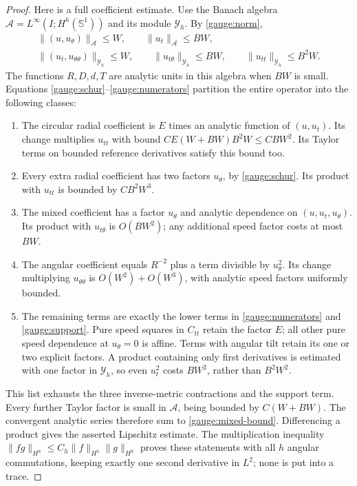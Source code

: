 \begin{proof}
Here is a full coefficient estimate.  Use the Banach algebra
$\mathcal A=L^\infty(I;H^h(\mathbb S^1))$ and its module
$\mathcal Y_h$.  By \eqref{gauge:norm},
\begin{equation}
 \begin{gathered}
 \|(u,u_\theta)\|_{\mathcal A}\le W,\qquad
 \|u_t\|_{\mathcal A}\le BW,\\
 \|(u_t,u_{\theta\theta})\|_{\mathcal Y_h}\le W,\qquad
 \|u_{t\theta}\|_{\mathcal Y_h}\le BW,\qquad
 \|u_{tt}\|_{\mathcal Y_h}\le B^2W.
 \end{gathered}
 \label{gauge:slots}
\end{equation}
The functions $R,D,d,T$ are analytic units in this algebra when $BW$
is small.  Equations \eqref{gauge:schur}--\eqref{gauge:numerators}
partition the entire operator into the following classes:
\begin{enumerate}
\item The circular radial coefficient is $E$ times an analytic function
of $(u,u_t)$.  Its change multiplies $u_{tt}$ with bound
$C E(W+BW)B^2W\le CBW^2$.
Its Taylor terms on bounded reference derivatives satisfy this bound too.
\item Every extra radial coefficient has two factors $u_\theta$, by
\eqref{gauge:schur}.  Its product with $u_{tt}$ is bounded by $CB^2W^3$.
\item The mixed coefficient has a factor $u_\theta$ and analytic dependence
on $(u,u_t,u_\theta)$.  Its product with $u_{t\theta}$ is $O(BW^2)$;
any additional speed factor costs at most $BW$.
\item The angular coefficient equals $R^{-2}$ plus a term divisible by
$u_\theta^2$.  Its change multiplying $u_{\theta\theta}$ is
$O(W^2)+O(W^3)$, with analytic speed factors uniformly bounded.
\item The remaining terms are exactly the lower terms in
\eqref{gauge:numerators} and \eqref{gauge:support}.
Pure speed squares in $C_{tt}$ retain the factor $E$; all other pure
speed dependence at $u_\theta=0$ is affine.  Terms with angular tilt
retain its one or two explicit factors.  A product containing only
first derivatives is estimated with one factor in $\mathcal Y_h$,
so even $u_t^2$ costs $BW^2$, rather than $B^2W^2$.
\end{enumerate}
This list exhausts the three inverse-metric contractions and the support
term.  Every further Taylor factor is small in $\mathcal A$, being
bounded by $C(W+BW)$.  The convergent analytic series therefore sum to
\eqref{gauge:mixed-bound}.  Differencing a product gives the asserted
Lipschitz estimate.  The multiplication inequality
$\|fg\|_{H^h}\le C_h\|f\|_{H^h}\|g\|_{H^h}$ proves these statements
with all $h$ angular commutations, keeping exactly one second derivative
in $L^2$; none is put into a trace.


\end{proof}
